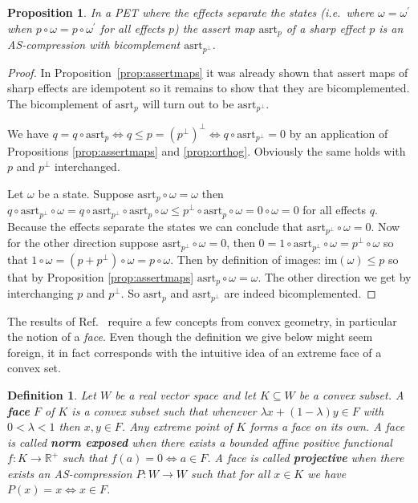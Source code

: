 \documentclass[a4paper,onecolumn,10pt,accepted=2019-05-03, issue=1, volume=1, shorttitle=papers/compositionality-1-1]{compositionalityarticle}
\newcounter{counter}
\numberwithin{counter}{section}
\newtheorem{proposition}[counter]{Proposition}
\newtheorem{definition}[counter]{Definition}
\newcommand{\R}{\mathbb{R}}
\newcommand{\asrt}{\text{asrt}}
\newcommand{\im}[1]{\text{im}(#1)}
\begin{document}
\begin{proposition}\label{prop:gencompr}
    In a PET where the effects separate the states (i.e.\ where $\omega=\omega^\prime$ when $p\circ \omega = p\circ \omega^\prime$ for all effects $p$) the assert map $\asrt_p$ of a sharp effect $p$ is an AS-compression with bicomplement $\asrt_{p^\perp}$.
\end{proposition}
\begin{proof}
    In Proposition~\ref{prop:assertmaps} it was already shown that assert maps of sharp effects are idempotent so it remains to show that they are bicomplemented. The bicomplement of $\asrt_p$ will turn out to be $\asrt_{p^\perp}$.

    We have $q=q\circ \asrt_p \iff q\leq p=(p^\perp)^\perp \iff q\circ \asrt_{p^\perp}=0$ by an application of Propositions \ref{prop:assertmaps} and \ref{prop:orthog}. Obviously the same holds with $p$ and $p^\perp$ interchanged.

    Let $\omega$ be a state. Suppose $\asrt_p\circ \omega = \omega$ then $q\circ \asrt_{p^\perp}\circ \omega = q\circ\asrt_{p^\perp}\circ \asrt_p\circ\omega \leq p^\perp\circ \asrt_p\circ \omega = 0\circ\omega = 0$ for all effects $q$. Because the effects separate the states we can conclude that $\asrt_{p^\perp}\circ \omega = 0$. Now for the other direction suppose $\asrt_{p^\perp}\circ \omega = 0$, then $0=1\circ \asrt_{p^\perp}\circ \omega = p^\perp\circ \omega$ so that $1\circ \omega = (p+p^\perp)\circ \omega = p\circ \omega$. Then by definition of images: $\im{\omega}\leq p$ so that by Proposition \ref{prop:assertmaps} $\asrt_p\circ \omega = \omega$. The other direction we get by interchanging $p$ and $p^\perp$. So $\asrt_p$ and $\asrt_{p^\perp}$ are indeed bicomplemented.
\end{proof}

The results of Ref.~\cite{alfsen2012geometry} require a few concepts from convex geometry, in particular the notion of a \emph{face}. Even though the definition we give below might seem foreign, it in fact corresponds with the intuitive idea of an extreme face of a convex set.

\begin{definition}
    Let $W$ be a real vector space and let $K\subseteq W$ be a convex subset. A \textbf{face} $F$ of $K$ is a convex subset such that whenever $\lambda x + (1-\lambda) y\in F$ with $0<\lambda<1$ then $x, y \in F$. Any extreme point of $K$ forms a face on its own. A face is called \textbf{norm exposed} when there exists a bounded affine positive functional $f:K\rightarrow \R^+$ such that $f(a)=0\iff a\in F$. A face is called \textbf{projective} when there exists an AS-compression $P:W\rightarrow W$ such that for all $x\in K$ we have $P(x)=x \iff x\in F$.
\end{definition}
\end{document}
